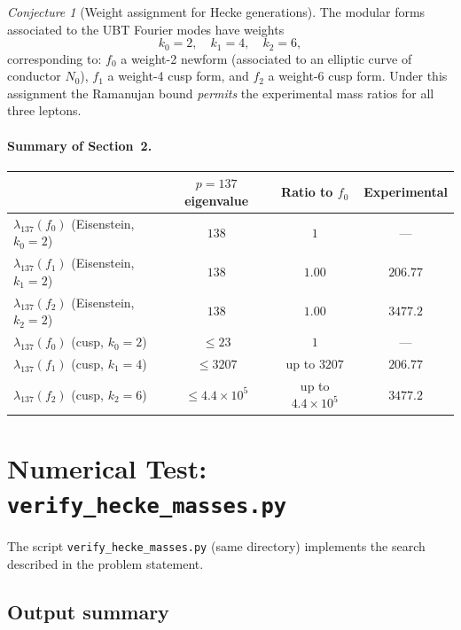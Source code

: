 \documentclass[12pt,a4paper]{article}
\theoremstyle{remark}
\newtheorem{conjecture}[theorem]{Conjecture}
\begin{document}
\begin{conjecture}[Weight assignment for Hecke generations]
\label{conj:weight_assignment}
The modular forms associated to the UBT Fourier modes have weights
\begin{equation}
  k_0 = 2,\quad k_1 = 4,\quad k_2 = 6,
\end{equation}
corresponding to: $f_0$ a weight-2 newform (associated to an elliptic
curve of conductor $N_0$), $f_1$ a weight-4 cusp form, and $f_2$ a
weight-6 cusp form.  Under this assignment the Ramanujan bound
\emph{permits} the experimental mass ratios for all three leptons.
\end{conjecture}

\paragraph{Summary of Section~2.}
\begin{center}
\begin{tabular}{@{}lccc@{}}
\toprule
 & $p=137$ eigenvalue & Ratio to $f_0$ & Experimental\\
\midrule
$\lambda_{137}(f_0)$ (Eisenstein, $k_0=2$) & $138$ & $1$ & —\\
$\lambda_{137}(f_1)$ (Eisenstein, $k_1=2$) & $138$ & $1.00$ & $206.77$\\
$\lambda_{137}(f_2)$ (Eisenstein, $k_2=2$) & $138$ & $1.00$ & $3477.2$\\
\midrule
$\lambda_{137}(f_0)$ (cusp, $k_0=2$) & $\leq 23$ & $1$ & —\\
$\lambda_{137}(f_1)$ (cusp, $k_1=4$) & $\leq 3207$ & up to $3207$ & $206.77$\\
$\lambda_{137}(f_2)$ (cusp, $k_2=6$) & $\leq 4.4\times10^5$ & up to $4.4\times10^5$ & $3477.2$\\
\bottomrule
\end{tabular}
\end{center}

\section{Numerical Test: \texttt{verify\_hecke\_masses.py}}
\label{sec:numerical}

The script \texttt{verify\_hecke\_masses.py} (same directory) implements
the search described in the problem statement.

\subsection{Output summary}
\end{document}
